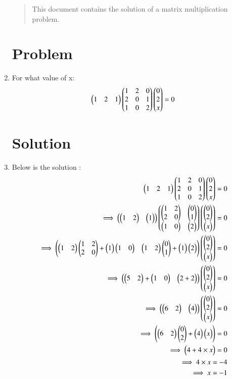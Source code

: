 \begin{enumerate}[label=\thesection.\arabic*.,ref=\thesection.\theenumi]

\begin{abstract}
    This document contains the solution of a matrix multiplication problem.
\end{abstract}

\section{Problem}
\item For what value of x:
\begin{align}
    \myvec{1 & 2 & 1}\myvec{1 & 2 & 0 \\2 & 0 & 1\\1 & 0 & 2}\myvec{0 \\ 2 \\ x}=0
\end{align}

\section{Solution}
\item Below is the solution :
\begin{align}
    \myvec{1 & 2 & 1}\myvec{1 & 2 & 0 \\2 & 0 & 1\\1 & 0 & 2}\myvec{0 \\ 2 \\ x}=0
\\
    \implies \myvec{\myvec{1&2}&\myvec{1}}\myvec{\myvec{1&2\\2&0}&\myvec{0\\1}\\\myvec{1&0}&\myvec{2}}\myvec{\myvec{0\\2}\\\myvec{x}}=0
\\
    \implies \myvec{\myvec{1&2}\myvec{1&2\\2&0}+\myvec{1}\myvec{1&0}&\myvec{1&2}\myvec{0\\1}+\myvec{1}\myvec{2}}\myvec{\myvec{0\\2}\\\myvec{x}}=0
\\
    \implies\myvec{\myvec{5&2}+\myvec{1&0}&\myvec{2+2}}\myvec{\myvec{0\\2}\\\myvec{x}}=0
\\
    \implies \myvec{\myvec{6&2}&\myvec{4}}\myvec{\myvec{0\\2}\\\myvec{x}}=0
\\
    \implies \myvec{\myvec{6&2}\myvec{0\\2}+\myvec{4}\myvec{x}}=0
\\
    \implies \myvec{4+4\times x}=0
\\
    \implies 4\times x=-4
\\
    \implies x=-1
\end{align}

\end{enumerate}


